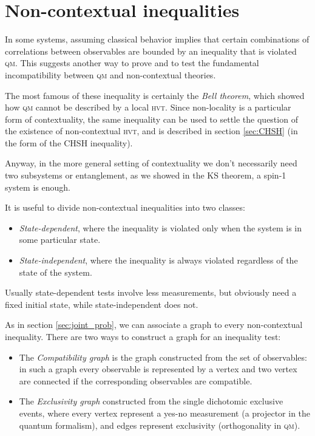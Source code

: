 \documentclass[a4paper]{article}
\newcommand{\acron}[1]{\textsc{#1}}
\newcommand{\HVT}{\acron{hvt}}
\newcommand{\QM}{\acron{qm}}
\theoremstyle{definition}
\begin{document}
\section{Non-contextual inequalities}
In some systems, assuming classical
behavior implies that certain combinations of correlations between observables
are bounded by an inequality that is violated \QM{}.
This suggests another way to prove and to test the fundamental
incompatibility between \QM{} and non-contextual theories.

The most famous of these inequality is certainly the \emph{Bell theorem}, which
showed how \QM{} cannot be described by a local \HVT{}.  Since non-locality is a
particular form of contextuality, the same inequality can be used to settle the
question of the existence of non-contextual \HVT{}, and is described in section
\ref{sec:CHSH} (in the form of the \acron{CHSH} inequality).

Anyway, in the more general setting of contextuality we don't necessarily need two
subsystems or entanglement, as we showed in the KS theorem, a spin-1 system is enough.

It is useful to divide non-contextual inequalities into two classes:
\begin{itemize}
    \item \emph{State-dependent}, where the inequality is violated only when the
        system is in some particular state.
    \item \emph{State-independent}, where the inequality is always violated
        regardless of the state of the system.
\end{itemize}
Usually state-dependent tests involve less measurements, but obviously need a
fixed initial state, while state-independent does not.

As in section \ref{sec:joint_prob}, we can associate a graph to every
non-contextual inequality.
There are two ways to construct a graph for an inequality test: 
\begin{itemize}
    \item The \emph{Compatibility graph} is the graph constructed from the set of observables: in such a
        graph every observable is represented by a vertex and two vertex are
        connected if the corresponding observables are compatible.
    \item The \emph{Exclusivity graph} constructed from the single dichotomic exclusive events,
        where every vertex represent a yes-no measurement (a projector in the
        quantum formalism), and edges represent exclusivity (orthogonality in
        \QM{}).
\end{itemize}
\end{document}
